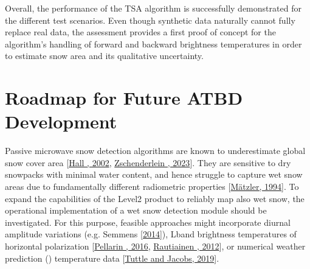 \documentclass[letterpaper,10pt,english]{jupyterBook}
\begin{document}
\sphinxAtStartPar
Overall, the performance of the TSA algorithm is successfully demonstrated for the different test scenarios.
Even though synthetic data naturally cannot fully replace real data, the assessment provides a first proof of concept for the algorithm’s handling of forward and backward brightness temperatures in order to estimate snow area and its qualitative uncertainty.

\sphinxstepscope


\chapter{Roadmap for Future ATBD Development}
\label{\detokenize{book/roadmap:roadmap-for-future-atbd-development}}\label{\detokenize{book/roadmap::doc}}
\sphinxAtStartPar
Passive microwave snow detection algorithms are known to underestimate global snow cover area {[}\hyperlink{cite.book/references:id2}{Hall , 2002}, \hyperlink{cite.book/references:id18}{Zschenderlein , 2023}{]}.
They are sensitive to dry snowpacks with minimal water content, and hence struggle to capture wet snow areas due to fundamentally different radiometric properties {[}\hyperlink{cite.book/references:id13}{Mätzler, 1994}{]}.
To expand the capabilities of the Level\sphinxhyphen{}2 {\hyperref[\detokenize{book/acronyms:term-TSA}]{}} product to reliably map also wet snow, the operational implementation of a wet snow detection module should be investigated.
For this purpose, feasible approaches might incorporate diurnal amplitude variations (e.g. Semmens  {[}\hyperlink{cite.book/references:id10}{2014}{]}), L\sphinxhyphen{}band brightness temperatures of horizontal polarization {[}\hyperlink{cite.book/references:id26}{Pellarin , 2016}, \hyperlink{cite.book/references:id25}{Rautiainen , 2012}{]}, or numerical weather prediction ({\hyperref[\detokenize{book/acronyms:term-NWP}]{}}) temperature data {[}\hyperlink{cite.book/references:id24}{Tuttle and Jacobs, 2019}{]}.
\end{document}
